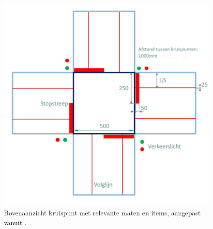 \documentclass[12pt]{article}
\begin{document}
\bigskip
\begin{figure}
	\centering
	\includegraphics[width=.8\textwidth]{bovenaanzichtkruispunt}
	\caption{Bovenaanzicht kruispunt met relevante maten en items, aangepast vanuit \cite{Smart}.
	}
	\label{fig: kruispunt}
\end{figure}








\end{document}
